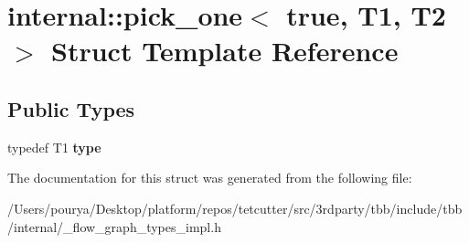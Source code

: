 \hypertarget{structinternal_1_1pick__one_3_01true_00_01T1_00_01T2_01_4}{}\section{internal\+:\+:pick\+\_\+one$<$ true, T1, T2 $>$ Struct Template Reference}
\label{structinternal_1_1pick__one_3_01true_00_01T1_00_01T2_01_4}
\subsection*{Public Types}
\begin{DoxyCompactItemize}
\item 
\hypertarget{structinternal_1_1pick__one_3_01true_00_01T1_00_01T2_01_4_a232994c6311567c0c05f978536cfad47}{}typedef T1 {\bfseries type}\label{structinternal_1_1pick__one_3_01true_00_01T1_00_01T2_01_4_a232994c6311567c0c05f978536cfad47}

\end{DoxyCompactItemize}


The documentation for this struct was generated from the following file\+:\begin{DoxyCompactItemize}
\item 
/\+Users/pourya/\+Desktop/platform/repos/tetcutter/src/3rdparty/tbb/include/tbb/internal/\+\_\+flow\+\_\+graph\+\_\+types\+\_\+impl.\+h\end{DoxyCompactItemize}
